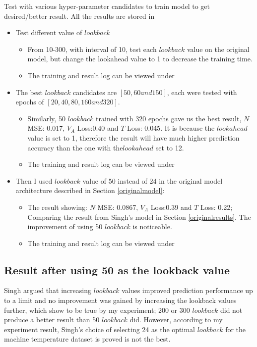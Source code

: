 \documentclass{article}
\begin{document}
Test with various hyper-parameter candidates to train model to get
desired/better result. All the results are stored in 
\begin{itemize}
	\setlength{\itemsep}{1pt}
	\setlength{\parskip}{0pt}
	\setlength{\parsep}{0pt}
	\item Test different value of $lookback$
		\begin{itemize}
			\item From 10-300, with interval of 10, test each $lookback$ value on the
original model, but change the lookahead value to 1 to decrease the training
time.
			\item The training and result log can be viewed under
		\end{itemize}
	\item The best $lookback$ candidates are $[50, 60 and 150]$, each were tested
with epochs of $[20, 40, 80, 160 and 320]$. 
		\begin{itemize}
			\item Similarly, 50 $lookback$ trained with 320 epochs gave us the best
result, $N$ MSE: 0.017, $V_A$ Loss:0.40 and $T$ Loss: 0.045. It is because the
$lookahead$ value is set to 1, therefore the result will have much higher
prediction accuracy than the one with the$lookahead$ set to 12.
			\item The training and result log can be viewed under
		\end{itemize}
	\item Then I used $lookback$ value of 50 instead of 24 in the original model
architecture described in Section \ref{originalmodel}:
		\begin{itemize}
			\item The result showing: $N$ MSE: 0.0867, $V_A$ Loss:0.39 and $T$ Loss:
0.22; Comparing the result from Singh's model in Section \ref{originalresults}.
The improvement of using 50 $lookback$ is noticeable.
			\item The training and result log can be viewed under
		\end{itemize}
\end{itemize}

\subsection{Result after using 50 as the lookback value}

Singh argued that increasing $lookback$ values improved prediction performance
up to a limit and no improvement was gained by increasing the lookback values
further, which show to be true by my experiment; 200 or 300 $lookback$ did not
produce a better result than 50 $lookback$ did. However, according to my
experiment result, Singh's choice of selecting 24 as the optimal $lookback$ for
the machine temperature dataset is proved is not the best. 
\end{document}

